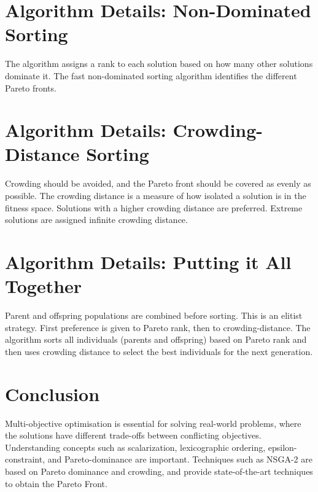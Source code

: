 \section{Algorithm Details: Non-Dominated Sorting}
The algorithm assigns a rank to each solution based on how many other solutions dominate it.
The fast non-dominated sorting algorithm identifies the different Pareto fronts.

\section{Algorithm Details: Crowding-Distance Sorting}
Crowding should be avoided, and the Pareto front should be covered as evenly as possible. The crowding distance is a measure of how isolated a solution is in the fitness space.  Solutions with a higher crowding distance are preferred.  Extreme solutions are assigned infinite crowding distance.

\section{Algorithm Details: Putting it All Together}
Parent and offspring populations are combined before sorting. This is an elitist strategy. First preference is given to Pareto rank, then to crowding-distance. The algorithm sorts all individuals (parents and offspring) based on Pareto rank and then uses crowding distance to select the best individuals for the next generation.

\section{Conclusion}
Multi-objective optimisation is essential for solving real-world problems, where the solutions have different trade-offs between conflicting objectives. Understanding concepts such as scalarization, lexicographic ordering, epsilon-constraint, and Pareto-dominance are important. Techniques such as NSGA-2 are based on Pareto dominance and crowding, and provide state-of-the-art techniques to obtain the Pareto Front.

